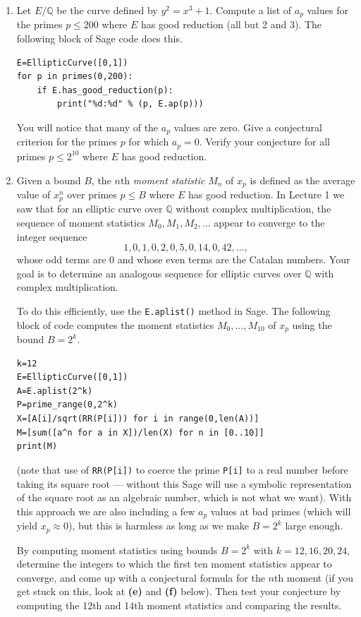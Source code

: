 \documentclass[11pt]{article}
\newcommand{\Q}{\mathbb{Q}}
\begin{document}
\begin{enumerate}
\item[\textbf{(a)}] Let $E/\Q$ be the curve defined by $y^2 = x^3+1$.
Compute a list of $a_p$ values for the primes $p\le 200$ where $E$ has good reduction (all but 2 and 3).
The following block of Sage code does this.

\begin{lstlisting}
E=EllipticCurve([0,1])
for p in primes(0,200):
    if E.has_good_reduction(p):
    	print("%d:%d" % (p, E.ap(p)))
\end{lstlisting}

You will notice that many of the $a_p$ values are zero.
Give a conjectural criterion for the primes $p$ for which $a_p=0$.
Verify your conjecture for all primes $p\le 2^{10}$ where $E$ has good reduction.

\item[\textbf{(b)}] Given a bound $B$, the $n$th \emph{moment statistic} $M_n$ of $x_p$ is defined as the average value of $x_p^n$ over primes $p\le B$ where $E$ has good reduction.  In Lecture 1 we saw that for an elliptic curve over $\Q$ without complex multiplication, the sequence of moment statistics $M_0, M_1, M_2,\ldots$ appear to converge to the integer sequence
\[
1,0,1,0,2,0,5,0,14,0,42,\ldots,
\]
whose odd terms are 0 and whose even terms are the Catalan numbers.
Your goal is to determine an analogous sequence for elliptic curves over $\Q$ with complex multiplication.

To do this efficiently, use the \texttt{E.aplist()} method in Sage.  The following block of code computes the moment statistics $M_0,\ldots,M_{10}$ of $x_p$ using the bound $B=2^k$.

\begin{lstlisting}
k=12
E=EllipticCurve([0,1])
A=E.aplist(2^k)
P=prime_range(0,2^k)
X=[A[i]/sqrt(RR(P[i])) for i in range(0,len(A))]
M=[sum([a^n for a in X])/len(X) for n in [0..10]]
print(M)
\end{lstlisting}

(note that use of \texttt{RR(P[i])} to coerce the prime \texttt{P[i]} to a real number before taking its square root --- without this Sage will use a symbolic representation of the square root as an algebraic number, which is not what we want).
With this approach we are also including a few $a_p$ values at bad primes (which will yield $x_p\approx 0$), but this is harmless as long as we make $B=2^k$ large enough.

By computing moment statistics using bounds $B=2^k$ with $k=12,16,20,24$, determine the integers to which the  first ten moment statistics appear to converge, and come up with a conjectural formula for the $n$th moment (if you get stuck on this, look at \textbf{(e)} and \textbf{(f)} below).  Then test your conjecture by computing the 12th and 14th moment statistics and comparing the results.


\end{enumerate}
\end{document}
